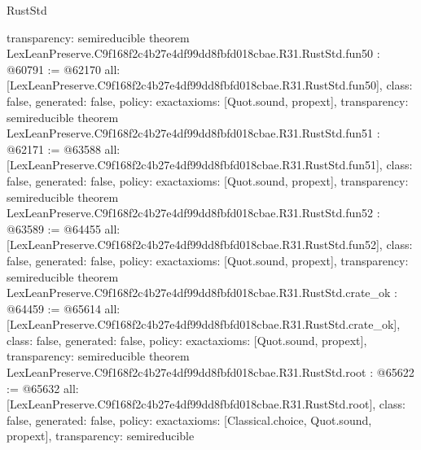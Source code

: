 \begin{lexlean}{RustStd}
\begin{coremodule}
{  transparency: semireducible
}
theorem LexLeanPreserve.C9f168f2c4b27e4df99dd8fbfd018cbae.R31.RustStd.fun50 : @60791 := @62170 {
  all: [LexLeanPreserve.C9f168f2c4b27e4df99dd8fbfd018cbae.R31.RustStd.fun50],
  class: false,
  generated: false,
  policy: exact{axioms: [Quot.sound, propext]},
  transparency: semireducible
}
theorem LexLeanPreserve.C9f168f2c4b27e4df99dd8fbfd018cbae.R31.RustStd.fun51 : @62171 := @63588 {
  all: [LexLeanPreserve.C9f168f2c4b27e4df99dd8fbfd018cbae.R31.RustStd.fun51],
  class: false,
  generated: false,
  policy: exact{axioms: [Quot.sound, propext]},
  transparency: semireducible
}
theorem LexLeanPreserve.C9f168f2c4b27e4df99dd8fbfd018cbae.R31.RustStd.fun52 : @63589 := @64455 {
  all: [LexLeanPreserve.C9f168f2c4b27e4df99dd8fbfd018cbae.R31.RustStd.fun52],
  class: false,
  generated: false,
  policy: exact{axioms: [Quot.sound, propext]},
  transparency: semireducible
}
theorem LexLeanPreserve.C9f168f2c4b27e4df99dd8fbfd018cbae.R31.RustStd.crate_ok : @64459 := @65614 {
  all: [LexLeanPreserve.C9f168f2c4b27e4df99dd8fbfd018cbae.R31.RustStd.crate_ok],
  class: false,
  generated: false,
  policy: exact{axioms: [Quot.sound, propext]},
  transparency: semireducible
}
theorem LexLeanPreserve.C9f168f2c4b27e4df99dd8fbfd018cbae.R31.RustStd.root : @65622 := @65632 {
  all: [LexLeanPreserve.C9f168f2c4b27e4df99dd8fbfd018cbae.R31.RustStd.root],
  class: false,
  generated: false,
  policy: exact{axioms: [Classical.choice, Quot.sound, propext]},
  transparency: semireducible
}


\end{coremodule}
\end{lexlean}
